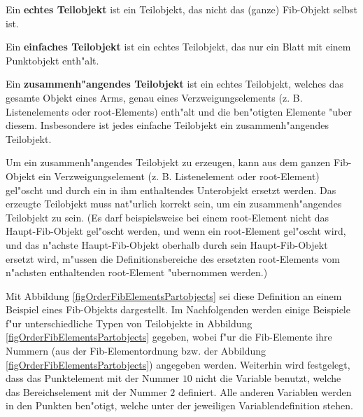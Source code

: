 Ein \textbf{echtes Teilobjekt} ist ein Teilobjekt, das nicht das (ganze) Fib-Objekt selbst ist.

Ein \textbf{einfaches Teilobjekt} ist ein echtes Teilobjekt, das nur ein Blatt mit einem Punktobjekt enth"alt.

Ein \textbf{zusammenh"angendes Teilobjekt} ist ein echtes Teilobjekt, welches das gesamte Objekt eines Arms, genau eines Verzweigungselements (z. B. Listenelements oder root-Elements) enth"alt und die ben"otigten Elemente "uber diesem. Insbesondere ist jedes einfache Teilobjekt ein zusammenh"angendes Teilobjekt.

Um ein zusammenh"angendes Teilobjekt zu erzeugen, kann aus dem ganzen Fib-Objekt ein Verzweigungselement (z. B. Listenelement oder root-Element) gel"oscht und durch ein in ihm enthaltendes Unterobjekt ersetzt werden. Das erzeugte Teilobjekt muss nat"urlich korrekt sein, um ein zusammenh"angendes Teilobjekt zu sein. (Es darf beispielsweise bei einem root-Element nicht das Haupt-Fib-Objekt gel"oscht werden, und wenn ein root-Element gel"oscht wird, und das n"achste Haupt-Fib-Objekt oberhalb durch sein Haupt-Fib-Objekt ersetzt wird, m"ussen die Definitionsbereiche des ersetzten root-Elements vom n"achsten enthaltenden root-Element "ubernommen werden.)

Mit Abbildung \ref{figOrderFibElementsPartobjects} sei diese Definition an einem Beispiel eines Fib-Objekts dargestellt. Im Nachfolgenden werden einige Beispiele f"ur unterschiedliche Typen von Teil\-objekte in Abbildung \ref{figOrderFibElementsPartobjects} gegeben, wobei f"ur die Fib-Elemente ihre Nummern (aus der Fib-Elementordnung bzw. der Abbildung \ref{figOrderFibElementsPartobjects}) angegeben werden. Weiterhin wird festgelegt, dass das Punktelement mit der Nummer $10$ nicht die Variable benutzt, welche das Bereichselement mit der Nummer $2$ definiert. Alle anderen Variablen werden in den Punkten ben"otigt, welche unter der jeweiligen Variablendefinition stehen.

